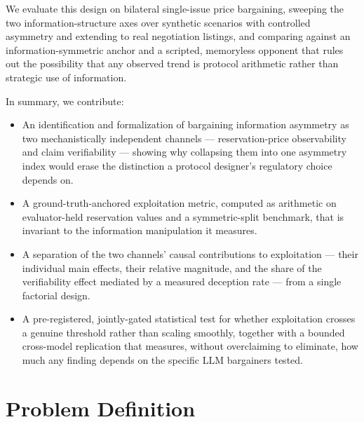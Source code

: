 \documentclass[11pt]{article}
\begin{document}
We evaluate this design on bilateral single-issue price bargaining, sweeping the two information-structure axes over synthetic scenarios with controlled asymmetry and extending to real negotiation listings, and comparing against an information-symmetric anchor and a scripted, memoryless opponent that rules out the possibility that any observed trend is protocol arithmetic rather than strategic use of information.

In summary, we contribute:
\begin{itemize}[leftmargin=1.4em]
\item An identification and formalization of bargaining information asymmetry as two mechanistically independent channels --- reservation-price observability and claim verifiability --- showing why collapsing them into one asymmetry index would erase the distinction a protocol designer's regulatory choice depends on.
\item A ground-truth-anchored exploitation metric, computed as arithmetic on evaluator-held reservation values and a symmetric-split benchmark, that is invariant to the information manipulation it measures.
\item A separation of the two channels' causal contributions to exploitation --- their individual main effects, their relative magnitude, and the share of the verifiability effect mediated by a measured deception rate --- from a single factorial design.
\item A pre-registered, jointly-gated statistical test for whether exploitation crosses a genuine threshold rather than scaling smoothly, together with a bounded cross-model replication that measures, without overclaiming to eliminate, how much any finding depends on the specific LLM bargainers tested.
\end{itemize}

\section{Problem Definition}
\end{document}

